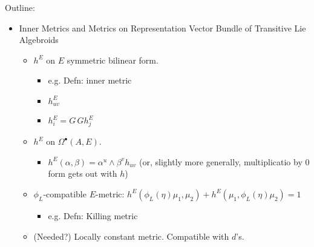 {
\color{gray}
    Outline:
    
    \begin{itemize}
    
    \item Inner Metrics and Metrics on Representation Vector Bundle of Transitive Lie Algebroids
    
        \begin{itemize}
            
        \item $h^E$ on $E$ symmetric bilinear form.
        
            \begin{itemize}
                
            \item e.g. Defn: inner metric
            
            \item $h^E_{uv}$
            
            \item $h^E_i = G \, G h^E_j$
                
            \end{itemize}
        
        \item $h^E$ on $\Omega^\bullet (A, E)$.
            
            \begin{itemize}
                
            \item $h^E(\alpha, \beta) = \alpha^u \wedge \beta^v h_{uv}$ (or, slightly more generally, multiplicatio by $0$ form gets out with $h$)
                
            \end{itemize}
            
        \item $\phi_L$-compatible $E$-metric: $h^E(\phi_L(\eta) \mu_1, \mu_2) + h^E(\mu_1, \phi_L(\eta)\mu_2) = 1$
        
            \begin{itemize}
                
            \item e.g. Defn: Killing metric
                
            \end{itemize}
        
        \item (Needed?) Locally constant metric. Compatible with $d$'s.
        

\end{itemize}
\end{itemize}}
